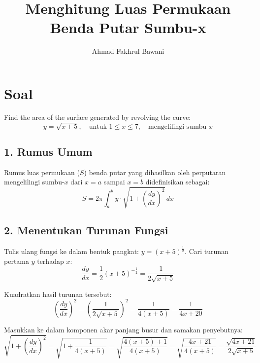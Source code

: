 \documentclass[12pt,a4paper]{article}
\title{Menghitung Luas Permukaan Benda Putar Sumbu-x}
\author{Ahmad Fakhrul Bawani}
\date{}
\begin{document}
\maketitle

\section*{Soal}

Find the area of the surface generated by revolving the curve:
\begin{equation*}
  y = \sqrt{x+5}, \quad \text{untuk } 1 \le x \le 7, \quad \text{mengelilingi sumbu-}x
\end{equation*}

\subsection*{1. Rumus Umum}
Rumus luas permukaan ($S$) benda putar yang dihasilkan oleh perputaran mengelilingi sumbu-$x$ dari $x = a$ sampai $x = b$ didefinisikan sebagai:
\begin{equation*}
  S = 2\pi \int_{a}^{b} y \cdot \sqrt{1 + \left(\frac{dy}{dx}\right)^2} \, dx
\end{equation*}

\subsection*{2. Menentukan Turunan Fungsi}
Tulis ulang fungsi ke dalam bentuk pangkat: $y = (x+5)^{\frac{1}{2}}$. Cari turunan pertama $y$ terhadap $x$:
\begin{equation*}
  \frac{dy}{dx} = \frac{1}{2}(x+5)^{-\frac{1}{2}} = \frac{1}{2\sqrt{x+5}}
\end{equation*}

Kuadratkan hasil turunan tersebut:
\begin{equation*}
  \left(\frac{dy}{dx}\right)^2 = \left(\frac{1}{2\sqrt{x+5}}\right)^2 = \frac{1}{4(x+5)} = \frac{1}{4x+20}
\end{equation*}

Masukkan ke dalam komponen akar panjang busur dan samakan penyebutnya:
\begin{equation*}
  \sqrt{1 + \left(\frac{dy}{dx}\right)^2} = \sqrt{1 + \frac{1}{4(x+5)}} = \sqrt{\frac{4(x+5) + 1}{4(x+5)}} = \sqrt{\frac{4x+21}{4(x+5)}} = \frac{\sqrt{4x+21}}{2\sqrt{x+5}}
\end{equation*}
\end{document}
